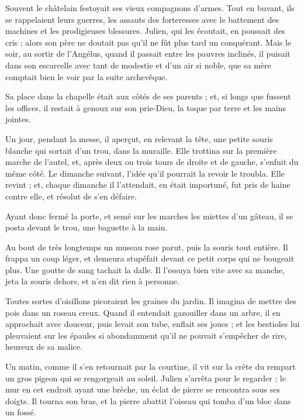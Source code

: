 \documentclass[]{book}
\begin{document}
                Souvent le châtelain festoyait ses vieux compagnons d'armes. Tout en buvant, ils se rappelaient leurs guerres, les assauts des forteresses avec le battement des machines et les prodigieuses blessures. Julien, qui les écoutait, en poussait des cris ; alors son père ne doutait pas qu'il ne fût plus tard un conquérant. Mais le soir, au sortir de l'Angélus, quand il passait entre les pauvres inclinés, il puisait dans son escarcelle avec tant de modestie et d'un air si noble, que sa mère comptait bien le voir par la suite archevêque.
                    
                Sa place dans la chapelle était aux côtés de ses parents ; et, si longs que fussent les offices, il restait à genoux sur son prie-Dieu, la toque par terre et les mains jointes.
                    
                Un jour, pendant la messe, il aperçut, en relevant la tête, une petite souris blanche qui sortait d'un trou, dans la muraille. Elle trottina sur la première marche de l'autel, et, après deux ou trois tours de droite et de gauche, s'enfuit du même côté. Le dimanche suivant, l'idée qu'il pourrait la revoir le troubla. Elle revint ; et, chaque dimanche il l'attendait, en était importuné, fut pris de haine contre elle, et résolut de s'en défaire.
                    
                Ayant donc fermé la porte, et semé sur les marches les miettes d'un gâteau, il se posta devant le trou, une baguette à la main.
                    
                Au bout de très longtemps un museau rose parut, puis la souris tout entière. Il frappa un coup léger, et demeura stupéfait devant ce petit corps qui ne bougeait plus. Une goutte de sang tachait la dalle. Il l'essuya bien vite avec sa manche, jeta la souris dehors, et n'en dit rien à personne.
                    
                Toutes sortes d'oisillons picoraient les graines du jardin. Il imagina de mettre des pois dans un roseau creux. Quand il entendait gazouiller dans un arbre, il en approchait avec douceur, puis levait son tube, enflait ses joues ; et les bestioles lui pleuvaient sur les épaules si abondamment qu'il ne pouvait s'empêcher de rire, heureux de sa malice.
                    
                Un matin, comme il s'en retournait par la courtine, il vit sur la crête du rempart un gros pigeon qui se rengorgeait au soleil. Julien s'arrêta pour le regarder ; le mur en cet endroit ayant une brèche, un éclat de pierre se rencontra sous ses doigts. Il tourna son bras, et la pierre abattit l'oiseau qui tomba d'un bloc dans un fossé.
                    
\end{document}
